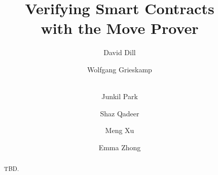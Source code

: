 \documentclass[runningheads]{llncs}
\begin{document}
\title{Verifying Smart Contracts\\ with the Move Prover}


\author{
  David Dill \and Wolfgang Grieskamp \and \\ Junkil
  Park \and Shaz Qadeer \and Meng Xu
  \and Emma Zhong
}


\maketitle
\begin{abstract}
TBD.
\end{abstract}











\appendix

\newpage

\newpage

\end{document}
